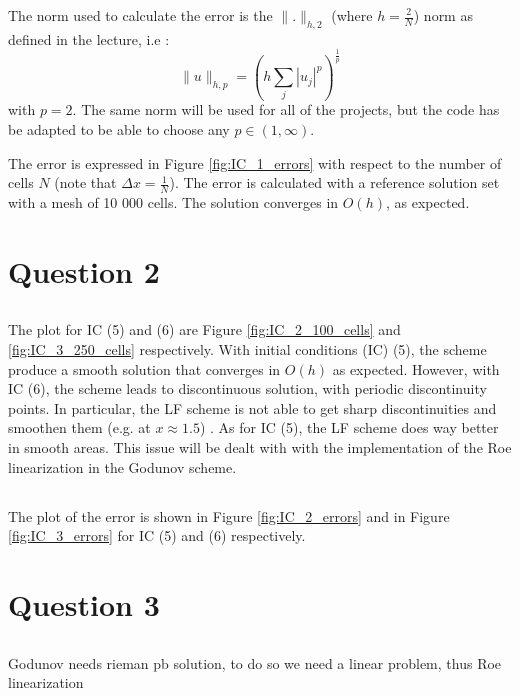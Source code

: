 \documentclass[11pt,a4paper]{article}
\begin{document}
The norm used to calculate the error is the $\| . \|_{h,2}$ (where $h=\frac{2}{N}$) norm as defined in the lecture, i.e :
\[ \|u\|_{h,p} = (h\sum_j |u_j|^p)^{\frac{1}{p}}\]
with $p=2$. The same norm will be used for all of the projects, but the code has be adapted to be able to choose any $p \in (1,\infty).$

The error is expressed in Figure \ref{fig:IC_1_errors} with respect to the number of cells $N$ (note that $\Delta x = \frac{1}{N}$). The error is calculated with a reference solution set with a mesh of 10 000 cells. The solution converges in $O(h)$, as expected. 




\section{Question 2}
\subsection{}
The plot for IC (5) and (6) are Figure \ref{fig:IC_2_100_cells} and \ref{fig:IC_3_250_cells} respectively. With initial conditions (IC) (5), the scheme produce a smooth solution that converges in $O(h)$ as expected. However, with IC (6), the scheme leads to discontinuous solution, with periodic discontinuity points. In particular, the LF scheme is not able to get sharp discontinuities and smoothen them (e.g. at $x \approx 1.5$) . As for IC (5), the LF scheme does way better in smooth areas. This issue will be dealt with with the implementation of the Roe linearization in the Godunov scheme.


\subsection{}
The plot of the error is shown in Figure \ref{fig:IC_2_errors} and in Figure \ref{fig:IC_3_errors} for IC (5) and (6) respectively.



\section{Question 3}
\subsection{}
Godunov needs rieman pb solution, to do so we need a linear problem, thus Roe linearization 
\end{document}
